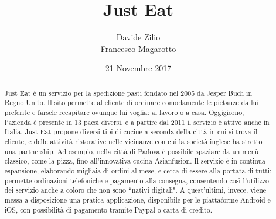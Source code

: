 \documentclass[10pt]{article}
\title{Just Eat}
\author{Davide Zilio\\Francesco Magarotto}
\date{21 Novembre 2017}
\begin{document}
	\maketitle
	\begin{LARGE}
	\begin{abstract}
	\begin{linenumbers}
	Just Eat \`e un servizio per la spedizione pasti fondato nel 2005 da Jesper Buch in Regno Unito. Il sito permette al cliente di ordinare comodamente le pietanze da lui preferite e farsele recapitare ovunque lui voglia: al lavoro o a casa. 
	Oggigiorno, l'azienda \`e presente in 13 paesi diversi, e a partire dal 2011 il servizio \`e  attivo anche in Italia. Just Eat propone diversi tipi di cucine a seconda della citt\`a in cui si trova il cliente, e delle attivit\`a ristorative nelle vicinanze con cui la società inglese ha stretto una partnership. Ad esempio, nella citt\`a di Padova \`e possibile spaziare da un men\`u classico, come la pizza, fino all'innovativa cucina Asianfusion. Il servizio \`e in continua espansione, elaborando migliaia di ordini al mese, e cerca di essere alla portata di tutti: permette ordinazioni telefoniche e pagamento alla consegna, consentendo cos\`i l'utilizzo dei servizio anche a coloro che non sono ``nativi digitali". A quest'ultimi, invece, viene messa a disposizione una pratica applicazione, disponibile per le piattaforme Android\texttrademark{} e iOS\texttrademark{}, con possibilit\`a di pagamento tramite Paypal\texttrademark{}  o carta di credito. 
	\end{linenumbers}
	\end{abstract}
	\end{LARGE}
	\pagebreak
\end{document}
